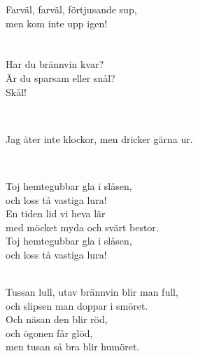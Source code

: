 \songtext{} Farväl, farväl, förtjusande sup, \\
men kom inte upp igen! \\


\vspace{0.15cm}
\melo{} \\
\\
Har du brännvin kvar? \\
Är du sparsam eller snål? \\
Skål! 

\newpage

 \\       

\songtext{}Jag äter inte klockor, 
men dricker gärna ur.


 \\       

\songtext{}
\leftrepeat Toj hemtegubbar gla i slåsen,\\
och loss tå vastiga lura! \rightrepeat \\
En tiden lid vi heva lär \\
med möcket myda och svärt bestor. \\
Toj hemtegubbar gla i slåsen, \\
och loss tå vastiga lura! \\


 \\       

\songtext{}
\leftrepeat Tussan lull, utav brännvin blir man full, \\
och slipsen man doppar i smöret. \rightrepeat \\
Och näsan den blir röd, \\
och ögonen får glöd, \\
men tusan så bra blir humöret.

\newpage 


 \\       

